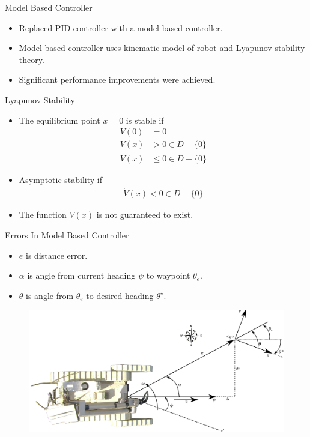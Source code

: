 \documentclass[hyperref={pdfpagelabels=false}]{beamer}
\begin{document}
\begin{frame}{Model Based Controller}
\begin{itemize}
\item Replaced PID controller with a model based controller.
\item Model based controller uses kinematic model of robot and Lyapunov stability theory.
\item Significant performance improvements were achieved.
\end{itemize}
\end{frame}

\begin{frame}{Lyapunov Stability}
\begin{itemize}
\item The equilibrium point $x=0$ is stable if
\begin{align*}
V(0) &= 0 \\
V(x) &> 0 \in D-\{0\} \\
\dot{V}(x) &\leq 0 \in D-\{0\}
\end{align*}
\item Asymptotic stability if
\begin{align*}
\dot{V}(x) < 0 \in D - \{0\}
\end{align*}
\item The function $V(x)$ is not guaranteed to exist.
\end{itemize}
\end{frame}

\begin{frame}{Errors In Model Based Controller}
\begin{itemize}
\item $e$ is distance error.
\item $\alpha$ is angle from current heading $\psi$ to waypoint $\theta_e$.
\item $\theta$ is angle from $\theta_e$ to desired heading $\theta^\star$.
\end{itemize}
\begin{figure}[ht!]
	\centering
	\includegraphics[width=.95\textwidth]{images/packbotlyapunov}
\end{figure}
\end{frame}
\end{document}
